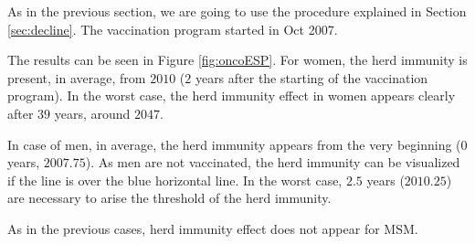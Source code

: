 As in the previous section, we are going to use the procedure explained in Section \ref{sec:decline}. The vaccination program started in Oct 2007.

The results can be seen in Figure \ref{fig:oncoESP}. For women, the herd immunity is present, in average, from $2010$ ($2$ years after the starting of the vaccination program). In the worst case, the herd immunity effect in women appears clearly after $39$ years, around $2047$.

In case of men, in average, the herd immunity appears from the very beginning ($0$ years, $2007.75$). As men are not vaccinated, the herd immunity can be visualized if the line is over the blue horizontal line. In the worst case, $2.5$ years ($2010.25$) are necessary to arise the threshold of the herd immunity.  

As in the previous cases, herd immunity effect does not appear for MSM.

